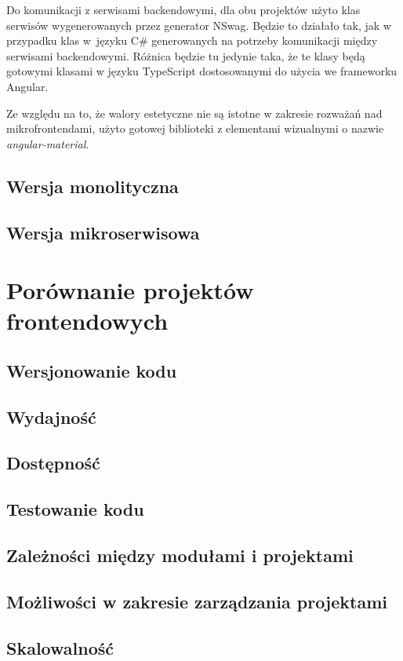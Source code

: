 \documentclass{SGGW-thesis}
\begin{document}
Do komunikacji z serwisami backendowymi, dla obu projektów użyto klas serwisów wygenerowanych przez generator NSwag. Będzie to działało tak, jak w przypadku klas w~języku C\# generowanych na potrzeby komunikacji między serwisami backendowymi. Różnica będzie tu jedynie taka, że te klasy będą gotowymi klasami w języku TypeScript dostosowanymi do użycia we frameworku Angular.

Ze względu na to, że walory estetyczne nie są istotne w zakresie rozważań nad mikrofrontendami, użyto gotowej biblioteki z elementami wizualnymi o nazwie \textit{angular-material}.

\section{Wersja monolityczna}
\section{Wersja mikroserwisowa}

\chapter{Porównanie projektów frontendowych}
\section{Wersjonowanie kodu}
\section{Wydajność}
\section{Dostępność}
\section{Testowanie kodu}
\section{Zależności między modułami i projektami}
\section{Możliwości w zakresie zarządzania projektami}
\section{Skalowalność}
\end{document}
